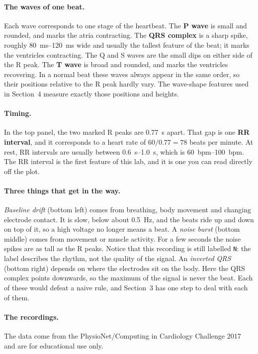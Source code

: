 \documentclass[12pt,article,oneside,linkcolour=blue]{oxengthesis}
\begin{document}
\paragraph{The waves of one beat.} Each wave corresponds to one stage of the heartbeat. The
\textbf{P wave} is small and rounded, and marks the atria contracting. The \textbf{QRS complex}
is a sharp spike, roughly \SIrange{80}{120}{\milli\second} wide and usually the tallest feature
of the beat; it marks the ventricles contracting. The Q and S waves are the small dips on either
side of the R peak. The \textbf{T wave} is broad and rounded, and marks the ventricles
recovering. In a normal beat these waves always appear in the same order, so their positions
relative to the R peak hardly vary. The wave-shape features used in Section~4 measure exactly
those positions and heights.

\paragraph{Timing.} In the top panel, the two marked R peaks are \SI{0.77}{\second} apart. That
gap is one \textbf{RR interval}, and it corresponds to a heart rate of $60 / 0.77 = 78$ beats per
minute. At rest, RR intervals are usually between \SIrange{0.6}{1.0}{\second}, which is
\SIrange{60}{100}{bpm}. The RR interval is the first feature of this lab, and it is one you can
read directly off the plot.

\paragraph{Three things that get in the way.} \emph{Baseline drift} (bottom left) comes from
breathing, body movement and changing electrode contact. It is slow, below about
\SI{0.5}{\hertz}, and the beats ride up and down on top of it, so a high voltage no longer means
a beat. A \emph{noise burst} (bottom middle) comes from movement or muscle activity. For a few
seconds the noise spikes are as tall as the R peaks. Notice that this recording is still labelled
\texttt{N}: the label describes the rhythm, not the quality of the signal. An \emph{inverted QRS}
(bottom right) depends on where the electrodes sit on the body. Here the QRS complex points
downwards, so the maximum of the signal is never the beat. Each of these would defeat a naive
rule, and Section~3 has one step to deal with each of them.

\paragraph{The recordings.} The data come from the PhysioNet/Computing in Cardiology Challenge
2017~\cite{clifford2017af, goldberger2000physionet} and are for educational use only.
\end{document}
